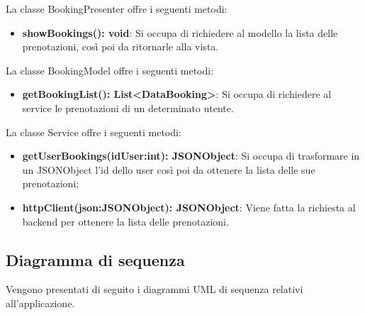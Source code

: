 La classe BookingPresenter offre i seguenti metodi:
\begin{itemize}
	\item \textbf{showBookings(): void}: Si occupa di richiedere al modello la lista delle prenotazioni, così poi da ritornarle alla vista. 
\end{itemize}

La classe BookingModel offre i seguenti metodi:
\begin{itemize}
	\item \textbf{getBookingList(): List<DataBooking>}: Si occupa di richiedere al service le prenotazioni di un determinato utente. 
\end{itemize}

La classe Service offre i seguenti metodi:
\begin{itemize}
	\item \textbf{getUserBookings(idUser:int): JSONObject}: Si occupa di trasformare in un JSONObject l'id dello user così poi da ottenere la lista delle sue prenotazioni;
	\item \textbf{httpClient(json:JSONObject): JSONObject}: Viene fatta la richiesta al backend per ottenere la lista delle prenotazioni.
 
\end{itemize}

\subsection{Diagramma di sequenza}
Vengono presentati di seguito i diagrammi UML di sequenza relativi all'applicazione.

